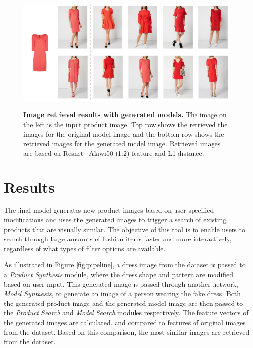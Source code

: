 \documentclass[12pt]{report}
\begin{document}
\begin{figure}[h]
\centering
{\includegraphics[width=\linewidth]{04_experiments/retrieval/generated/pix2pix_retrieval}}
\caption{\label{fig:search_synt_model} \textbf{Image retrieval results with generated models.} The image on the left is the input product image. Top row shows the retrieved the images for the original model image and the bottom row shows the retrieved images for the generated model image. Retrieved images are based on Resnet+Akiwi50 (1:2) feature and L1 distance.}
\end{figure}

\pagebreak
\chapter{Results}
The final model generates new product images based on user-specified modifications and uses the generated images to trigger a search of existing products that are visually similar. The objective of this tool is to enable users to search through large amounts of fashion items faster and more interactively, regardless of what types of filter options are available.

As illustrated in Figure \ref{fig:pipeline}, a dress image from the dataset is passed to a \textit{Product Synthesis} module, where the dress shape and pattern are modified based on user input. This generated image is passed through another network, \textit{Model Synthesis}, to generate an image of a person wearing the fake dress. Both the generated product image and the generated model image are then passed to the \textit{Product Search} and \textit{Model Search} modules respectively. The feature vectors of the generated images are calculated, and compared to features of original images from the dataset. Based on this comparison, the most similar images are retrieved from the dataset.
\end{document}

